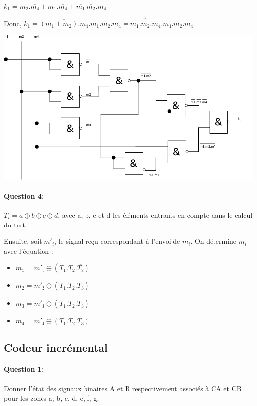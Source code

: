 $k_1=m_2.\overline{m_4}+m_1.\overline{m_4}+\overline{m_1}.\overline{m_2}.m_4$

Donc, $\overline{k_1}=\overline{(m_1+m_2).\overline{m_4}}.\overline{\overline{m_1}.\overline{m_2}.m_4}=\overline{\overline{\overline{m_1}.\overline{m_2}}.\overline{m_4}}.\overline{\overline{m_1}.\overline{m_2}.m_4}$

\begin{center}
 \includegraphics[width=0.8\linewidth]{img/nands}
\end{center}

\paragraph{Question 4:}

$T_i=a\oplus b \oplus c\oplus d$, avec a, b, c et d les éléments entrants en compte dans le calcul du test.

Ensuite, soit $m'_i$, le signal reçu correspondant à l'envoi de $m_i$. On  détermine $m_i$ avec l'équation :
\begin{itemize}
 \item $m_1=m'_1\oplus (T_1.T_2.\overline{T_3})$
 \item $m_2=m'_2\oplus (T_1.\overline{T_2}.T_3)$
 \item $m_3=m'_3\oplus (\overline{T_1}.T_2.T_3)$
 \item $m_4=m'_4\oplus (T_1.T_2.T_3)$
\end{itemize}

\subsection{Codeur incrémental}

\paragraph{Question 1:} Donner l'état des signaux binaires A et B respectivement associés à CA et CB pour les zones a, b, c, d, e, f, g.

